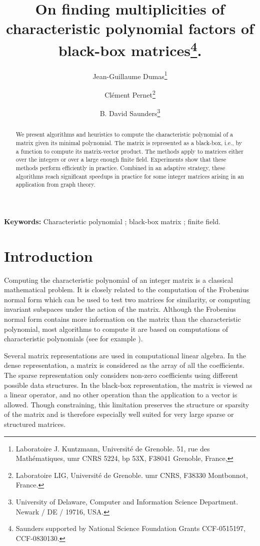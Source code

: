 \documentclass{article}
\begin{document}
\title{On finding multiplicities of characteristic polynomial factors
  of black-box matrices\thanks{Saunders supported by National Science
    Foundation Grants CCF-0515197, CCF-0830130.}.
}
\author{
Jean-Guillaume Dumas\thanks{Laboratoire J. Kuntzmann, Universit\'e de
  Grenoble. 51, rue des Math\'ematiques, umr CNRS 5224, bp 53X, F38041
  Grenoble, France, \jgdemail}
\and Cl\'ement Pernet\thanks{Laboratoire LIG, Universit\'e de
  Grenoble. umr CNRS, F38330 Montbonnot, France. \cpemail}
\and B. David Saunders\thanks{University of Delaware, Computer and
  Information Science Department. Newark / DE / 19716, USA. \bdsemail}
}

\maketitle


\begin{abstract}
We present algorithms and heuristics to compute the characteristic polynomial of a
matrix given its minimal polynomial. 
The matrix is represented as a black-box, i.e., by a function to compute
its matrix-vector product. 
The methods apply to matrices either over the integers or over a large enough finite field.
Experiments show that these methods perform efficiently in practice. Combined in
an adaptive strategy, these algorithms reach significant speedups in practice
for some integer matrices arising in an application from graph theory.
 \end{abstract}
 \noindent
 {\bf Keywords:} Characteristic polynomial ; black-box matrix ; finite field.

\section{Introduction}
Computing the characteristic polynomial of an integer matrix is a
classical mathematical problem. 
It is closely related to the computation of the Frobenius normal form
which can be used to test two matrices for similarity, or computing invariant
subspaces under the action of the matrix.
Although the Frobenius normal form contains more information on 
the matrix than the characteristic polynomial, most algorithms to
compute it are based on computations of characteristic polynomials (see
for example \cite[\S 9.7]{Storjohann:2000:thesis}).

Several matrix representations are used in computational linear algebra. In the
dense representation, a  matrix is considered as the array of all the 
coefficients. 
The sparse representation only considers non-zero coefficients using different possible
data structures. In the black-box representation,  the matrix is viewed  as a linear
operator, and no other operation than the application to a vector is
allowed. Though constraining, this limitation preserves the structure or
sparsity of the matrix and is therefore especially well suited for very large
sparse or structured matrices.
\end{document}

